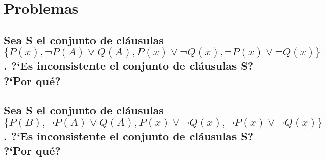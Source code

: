 \documentclass[10pt, a4paper,spanish]{article}
\begin{document}
	\section{Problemas}

		\subsection{Sea S el conjunto de cláusulas $ \{ P(x), \lnot P(A) \lor Q(A), P(x) \lor \lnot Q(x), \lnot P(x) \lor \lnot Q(x) \} $. ?`Es inconsistente el conjunto de cláusulas S? ?`Por qué?}

			\paragraph{}


		\subsection{Sea S el conjunto de cláusulas $ \{ P(B), \lnot P(A) \lor Q(A), P(x) \lor \lnot Q(x), \lnot P(x) \lor \lnot Q(x) \} $. ?`Es inconsistente el conjunto de cláusulas S? ?`Por qué?}

			\paragraph{}
\end{document}
